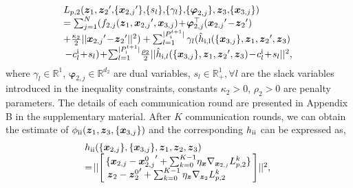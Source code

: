 \documentclass[letterpaper]{article} %
\begin{document}
\begin{equation}
\begin{array}{l}
\!   L_{p,2}({\boldsymbol{z}_1},{\boldsymbol{z}_2}', \! \{{\boldsymbol{x}_{2,j}}'\},\! \{ s_l\},\! \{\gamma_l\},\! \{\boldsymbol{\varphi}_{2,j}\}, {\boldsymbol{z}_3},\! \{{\boldsymbol{x}_{3,j}}\}) \\%

\!  =  \sum\nolimits_{j=1}^N  ({{f_{2,j}}({\boldsymbol{z}_1},{\boldsymbol{x}_{2,j}}',{\boldsymbol{x}_{3,j}})} \!+\! {\boldsymbol{\varphi}_{2,j}^{\top}}({\boldsymbol{x}_{2,j}}'\! -\! {\boldsymbol{z}_2}')  \\
\! + \frac{\kappa_2}{2}||{\boldsymbol{x}_{2,j}}'\!-\! {\boldsymbol{z}_2}'||^2 )

+\sum\nolimits_{l = 1}^{|P_{\rm{\uppercase\expandafter{\romannumeral1}}}^{t + 1}|} \gamma_l ( \hat{h}_{\rm{\uppercase\expandafter{\romannumeral1}},l}(\{{\boldsymbol{x}_{3,j}}\},\boldsymbol{z}_1, {\boldsymbol{z}_2}',\boldsymbol{z}_3 )
\\
- c_l^{\rm{\uppercase\expandafter{\romannumeral1}}} \!+\!s_l )
\! + \! \sum\nolimits_{l = 1}^{|P_{\rm{\uppercase\expandafter{\romannumeral1}}}^{t + 1}|} \! \frac{\rho_2}{2} || \hat{h}_{{\rm{\uppercase\expandafter{\romannumeral1}}},l}(\{{\boldsymbol{x}_{3,j}}\},\boldsymbol{z}_1, {\boldsymbol{z}_2}',\boldsymbol{z}_3 ) \! - \! c_l^{\rm{\uppercase\expandafter{\romannumeral1}}} \! + \! s_l||^2,
\end{array}
\end{equation}
where $\gamma_l \!\in\! \mathbb{R}^1$, ${\boldsymbol{\varphi}_{2,j}}\!\in\! \mathbb{R}^{d_2}$ are dual variables, $s_l\!\in\!\mathbb{R}^1_{+},\forall l$ are the slack variables introduced in the inequality constraints, constants $\kappa_2\!>\!0$, $\rho_2\!>\!0$ are penalty parameters. The details of each communication round are presented in Appendix B in the supplementary material.  After $K$ communication rounds, we can obtain the estimate of $\phi_{{\rm{\uppercase\expandafter{\romannumeral2}}}}({\boldsymbol{z}_1}, {\boldsymbol{z}_3}, \{{\boldsymbol{x}_{3,j}}\})$ and the corresponding $h_{{\rm{\uppercase\expandafter{\romannumeral2}}}}$ can be expressed as,
\begin{equation}
\label{eq:4_23_18}
\begin{array}{l}
\!    h_{{\rm{\uppercase\expandafter{\romannumeral2}}}}(\{{\boldsymbol{x}_{2,j}}\} ,\{ {\boldsymbol{x}_{3,j}}\} ,{\boldsymbol{z}_1}, {\boldsymbol{z}_2},{\boldsymbol{z}_3}) \\

\!=\! ||\! \left[\! \begin{array}{l}
\! \{ \boldsymbol{x}_{2,j} - {\boldsymbol{x}_{2,j}^{0}}'+\sum\nolimits_{k = 0}^{K-1} \! \eta_{\boldsymbol{x}}  \nabla_{\boldsymbol{x}_{2,j}}  L_{p,2}^k \} \! \\%

\boldsymbol{z}_2 - {\boldsymbol{z}_2^{0}}'+\sum\nolimits_{k = 0}^{K-1} \eta_{\boldsymbol{z}} \nabla_{\boldsymbol{z}_2}  L_{p,2}^k
\end{array} \! \right]\!  ||^2 ,
\end{array}
\end{equation}
\end{document}
